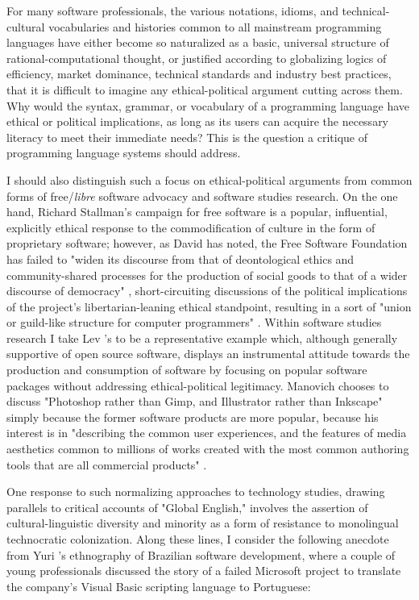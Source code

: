 For many software professionals, the various notations, idioms, and technical-cultural vocabularies and histories common to all mainstream programming languages have either become so naturalized as a basic, universal structure of rational-computational thought, or justified according to globalizing logics of efficiency, market dominance, technical standards and industry best practices, that it is difficult to imagine any ethical-political argument cutting across them. Why would the syntax, grammar, or vocabulary of a programming language have ethical or political implications, as long as its users can acquire the necessary literacy to meet their immediate needs? This is the question a critique of programming language systems should address.

I should also distinguish such a focus on ethical-political arguments from common forms of free/\emph{libre} software advocacy and software studies research. On the one hand, Richard Stallman's campaign for free software is a popular, influential, explicitly ethical response to the commodification of culture in the form of proprietary software; however, as David \citeauthor{Berry2008} has noted, the Free Software Foundation has failed to "widen its discourse from that of deontological ethics and community-shared processes for the production of social goods to that of a wider discourse of democracy" \autocite*[185]{Berry2008}, short-circuiting discussions of the political implications of the project's libertarian-leaning ethical standpoint, resulting in a sort of "union or guild-like structure for computer programmers" \autocite[101]{Berry2008}. Within software studies research I take Lev \citeauthor{Manovich13}'s  to be a representative example which, although generally supportive of open source software, displays an instrumental attitude towards the production and consumption of software by focusing on popular software packages without addressing ethical-political legitimacy. Manovich chooses to discuss "Photoshop rather than Gimp, and Illustrator rather than Inkscape" simply because the former software products are more popular, because his interest is in "describing the common user experiences, and the features of media aesthetics common to millions of works created with the most common authoring tools that are all commercial products" \autocite[50--1]{Manovich13}.

One response to such normalizing approaches to technology studies, drawing parallels to critical accounts of "Global English," involves the assertion of cultural-linguistic diversity and minority as a form of resistance to monolingual technocratic colonization. Along these lines, I consider the following anecdote from Yuri \citeauthor{Takhteyev12}'s ethnography of Brazilian software development, where a couple of young professionals discussed the story of a failed Microsoft project to translate the company's Visual Basic scripting language to Portuguese:

